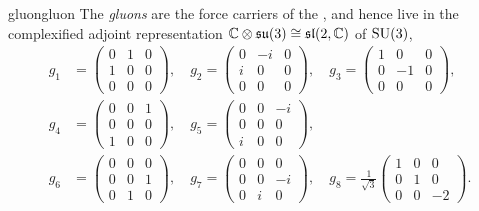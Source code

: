 \begin{topic}{gluon}{gluon}
    The \emph{gluons} are the force carriers of the , and hence live in the complexified adjoint representation $\mathbb{C} \otimes \mathfrak{su}(3) \cong \mathfrak{sl}(2, \mathbb{C})$ of $\textup{SU}(3)$,
    \[ \begin{aligned}
        g_1 &= \begin{pmatrix} 0 & 1 & 0 \\ 1 & 0 & 0 \\ 0 & 0 & 0 \end{pmatrix}, \quad g_2 = \begin{pmatrix} 0 & -i & 0 \\ i & 0 & 0 \\ 0 & 0 & 0 \end{pmatrix}, \quad g_3 = \begin{pmatrix} 1 & 0 & 0 \\ 0 & -1 & 0 \\ 0 & 0 & 0 \end{pmatrix}, \\
        g_4 &= \begin{pmatrix} 0 & 0 & 1 \\ 0 & 0 & 0 \\ 1 & 0 & 0 \end{pmatrix}, \quad g_5 = \begin{pmatrix} 0 & 0 & -i \\ 0 & 0 & 0 \\ i & 0 & 0 \end{pmatrix}, \\
        g_6 &= \begin{pmatrix} 0 & 0 & 0 \\ 0 & 0 & 1 \\ 0 & 1 & 0 \end{pmatrix}, \quad g_7 = \begin{pmatrix} 0 & 0 & 0 \\ 0 & 0 & -i \\ 0 & i & 0 \end{pmatrix}, \quad g_8 = \frac{1}{\sqrt{3}} \begin{pmatrix} 1 & 0 & 0 \\ 0 & 1 & 0 \\ 0 & 0 & -2 \end{pmatrix} .
    \end{aligned} \]
\end{topic}

    
